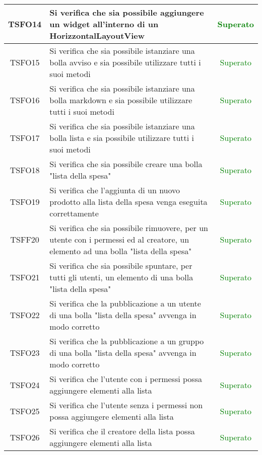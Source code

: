 \begin{center}
\begin{longtable}{|c|>{\centering}m{10cm}|c|}
		TSFO14 & Si verifica che sia possibile aggiungere un widget all'interno di un HorizzontalLayoutView & \textcolor{Green}{Superato}\\ \hline
		TSFO15 & Si verifica che sia possibile istanziare una bolla avviso e sia possibile utilizzare tutti i suoi metodi & \textcolor{Green}{Superato}\\ \hline
		TSFO16 & Si verifica che sia possibile istanziare una bolla markdown e sia possibile utilizzare tutti i suoi metodi & \textcolor{Green}{Superato}\\ \hline
		TSFO17 & Si verifica che sia possibile istanziare una bolla lista e sia possibile utilizzare tutti i suoi metodi & \textcolor{Green}{Superato}\\ \hline
		TSFO18 & Si verifica che sia possibile creare una bolla "lista della spesa" & \textcolor{Green}{Superato}\\ \hline
		TSFO19 & Si verifica che l'aggiunta di un nuovo prodotto alla lista della spesa venga eseguita correttamente & \textcolor{Green}{Superato}\\ \hline
		TSFF20 & Si verifica che sia possibile rimuovere, per un utente con i permessi ed al creatore, un elemento ad una bolla "lista della spesa" & \textcolor{Green}{Superato}\\ \hline
		TSFO21 & Si verifica che sia possibile spuntare, per tutti gli utenti, un elemento di una bolla "lista della spesa" & \textcolor{Green}{Superato}\\ \hline
		TSFO22 & Si verifica che la pubblicazione a un utente di una bolla "lista della spesa" avvenga in modo corretto & \textcolor{Green}{Superato}\\ \hline
		TSFO23 & Si verifica che la pubblicazione a un gruppo di una bolla "lista della spesa" avvenga in modo corretto & \textcolor{Green}{Superato}\\ \hline
		TSFO24 & Si verifica che l'utente con i permessi possa aggiungere elementi alla lista & \textcolor{Green}{Superato}\\ \hline
		TSFO25 & Si verifica che l'utente senza i permessi non possa aggiungere elementi alla lista & \textcolor{Green}{Superato}\\ \hline
		TSFO26 & Si verifica che il creatore della lista possa aggiungere elementi alla lista & \textcolor{Green}{Superato}\\ \hline
	\end{longtable}
\end{center}
